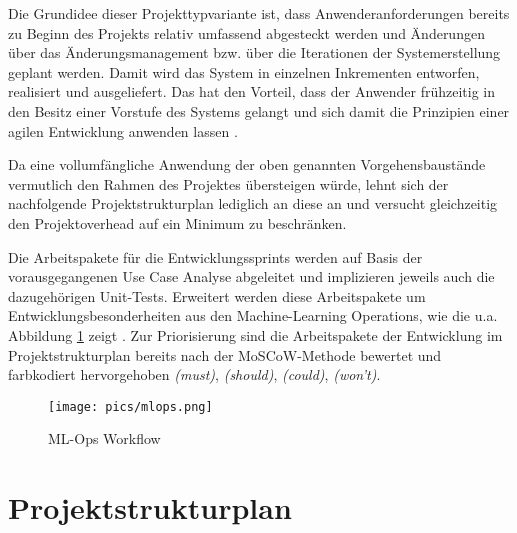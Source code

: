 Die Grundidee dieser Projekttypvariante ist, dass Anwenderanforderungen bereits zu Beginn des Projekts relativ umfassend abgesteckt werden und Änderungen über das Änderungsmanagement bzw. über die Iterationen der Systemerstellung geplant werden. Damit wird das System in einzelnen Inkrementen entworfen, realisiert und ausgeliefert. Das hat den Vorteil, dass der Anwender frühzeitig in den Besitz einer Vorstufe des Systems gelangt und sich damit die Prinzipien einer agilen Entwicklung anwenden lassen \citep[S.280]{angermeier_v-modell-xt_2024}.

Da eine vollumfängliche Anwendung der oben genannten Vorgehensbaustände vermutlich den Rahmen des Projektes übersteigen würde, lehnt sich der nachfolgende Projektstrukturplan lediglich an diese an und versucht gleichzeitig den Projektoverhead auf ein Minimum zu beschränken.

Die Arbeitspakete für die Entwicklungssprints werden auf Basis der vorausgegangenen Use Case Analyse abgeleitet und implizieren jeweils auch die dazugehörigen Unit-Tests. Erweitert werden diese Arbeitspakete um Entwicklungsbesonderheiten aus den Machine-Learning Operations, wie die u.a. Abbildung \ref{fig:mission} zeigt \citep[S.3]{tamburri_sustainable_2020}. Zur Priorisierung sind die Arbeitspakete der Entwicklung im Projektstrukturplan bereits nach der MoSCoW-Methode bewertet und farbkodiert hervorgehoben \textit{(\colorbox{hellrot}{must})}, \textit{(\colorbox{hellgelb}{should})}, \textit{(\colorbox{hellgreen}{could})}, \textit{(\colorbox{hellgrau}{won't})}.

\begin{figure}[h]
\centering
\texttt{[image: pics/mlops.png]}
\caption{ML-Ops Workflow} \citep[S.3]{tamburri_sustainable_2020}
\label{fig:mission}
\end{figure}

\FloatBarrier


	
\section{Projektstrukturplan}

